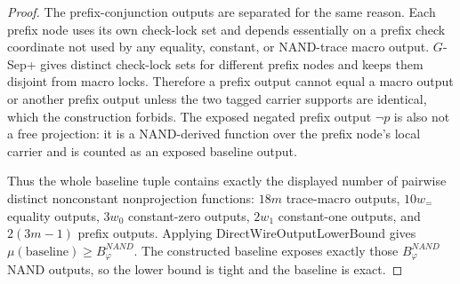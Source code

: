 \documentclass[10.5pt,a4paper]{article}
\begin{document}
\begin{proof}
The prefix-conjunction outputs are separated for the same reason.  Each prefix node uses its own check-lock set
and depends essentially on a prefix check coordinate not used by any equality, constant, or NAND-trace macro
output.  \(G\)-Sep+ gives distinct check-lock sets for different prefix nodes and keeps them disjoint from macro
locks.  Therefore a prefix output cannot equal a macro output or another prefix output unless the two tagged
carrier supports are identical, which the construction forbids.  The exposed negated prefix output \(\neg p\) is
also not a free projection: it is a NAND-derived function over the prefix node's local carrier and is counted as an
exposed baseline output.

Thus the whole baseline tuple contains exactly the displayed number of pairwise distinct nonconstant
nonprojection functions: \(18m\) trace-macro outputs, \(10w_=\) equality outputs, \(3w_0\) constant-zero outputs,
\(2w_1\) constant-one outputs, and \(2(3m-1)\) prefix outputs.  Applying DirectWireOutputLowerBound gives
\(\mu(\text{baseline})\ge B^{NAND}_\varphi\).  The constructed baseline exposes exactly those
\(B^{NAND}_\varphi\) NAND outputs, so the lower bound is tight and the baseline is exact.
\end{proof}
\end{document}
